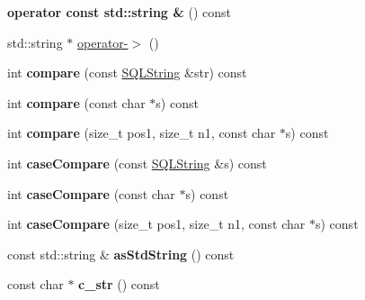 \begin{DoxyCompactItemize}
\item 
\hypertarget{classsql_1_1_s_q_l_string_a4d1e10a51df4e9fc9856cfe7671129c1}{}\label{classsql_1_1_s_q_l_string_a4d1e10a51df4e9fc9856cfe7671129c1} 
{\bfseries operator const std\+::string \&} () const
\item 
std\+::string $\ast$ \hyperlink{classsql_1_1_s_q_l_string_a9a73b4b85edeea38025068914fc7c392}{operator-\/$>$} ()
\item 
\hypertarget{classsql_1_1_s_q_l_string_abb7aa8481365854f4766a31f80c4f84e}{}\label{classsql_1_1_s_q_l_string_abb7aa8481365854f4766a31f80c4f84e} 
int {\bfseries compare} (const \hyperlink{classsql_1_1_s_q_l_string}{S\+Q\+L\+String} \&str) const
\item 
\hypertarget{classsql_1_1_s_q_l_string_af65f75aaac05255a5e58219519ab5049}{}\label{classsql_1_1_s_q_l_string_af65f75aaac05255a5e58219519ab5049} 
int {\bfseries compare} (const char $\ast$s) const
\item 
\hypertarget{classsql_1_1_s_q_l_string_a11fe11219258d1f2390319ab41d156ee}{}\label{classsql_1_1_s_q_l_string_a11fe11219258d1f2390319ab41d156ee} 
int {\bfseries compare} (size\+\_\+t pos1, size\+\_\+t n1, const char $\ast$s) const
\item 
\hypertarget{classsql_1_1_s_q_l_string_a1a5f2c1258e23382a3206933364cfae9}{}\label{classsql_1_1_s_q_l_string_a1a5f2c1258e23382a3206933364cfae9} 
int {\bfseries case\+Compare} (const \hyperlink{classsql_1_1_s_q_l_string}{S\+Q\+L\+String} \&s) const
\item 
\hypertarget{classsql_1_1_s_q_l_string_a8b737f00858b2fd538e45de7f1c0fc58}{}\label{classsql_1_1_s_q_l_string_a8b737f00858b2fd538e45de7f1c0fc58} 
int {\bfseries case\+Compare} (const char $\ast$s) const
\item 
\hypertarget{classsql_1_1_s_q_l_string_ae7d0364b1c4bb90a622d369f080deac5}{}\label{classsql_1_1_s_q_l_string_ae7d0364b1c4bb90a622d369f080deac5} 
int {\bfseries case\+Compare} (size\+\_\+t pos1, size\+\_\+t n1, const char $\ast$s) const
\item 
\hypertarget{classsql_1_1_s_q_l_string_a923bf7c325d594d9e72b162f11fa9fd7}{}\label{classsql_1_1_s_q_l_string_a923bf7c325d594d9e72b162f11fa9fd7} 
const std\+::string \& {\bfseries as\+Std\+String} () const
\item 
\hypertarget{classsql_1_1_s_q_l_string_aaada0a7bb05515055b99e9f68c91bb78}{}\label{classsql_1_1_s_q_l_string_aaada0a7bb05515055b99e9f68c91bb78} 
const char $\ast$ {\bfseries c\+\_\+str} () const
\item 
\hypertarget{classsql_1_1_s_q_l_string_a36d8345110c4cc0aa61826116c196025}{}\label{classsql_1_1_s_q_l_string_a36d8345110c4cc0aa61826116c196025} 

\end{DoxyCompactItemize}
